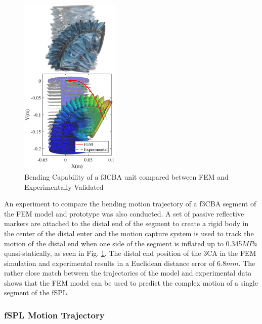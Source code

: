 \documentclass[letterpaper, 10 pt, conference]{ieeeconf}  %
\begin{document}
\begin{figure}[t!]
\centering
\includegraphics[width=0.43\textwidth]{Figures/3CA_bend_FEM_REAL_v2}
\caption{Bending Capability of a f3CBA unit compared between FEM and Experimentally Validated}
\label{fig:f3CAs_bend_fem_real}
\vspace{-1.5em}
\end{figure}


An experiment to compare the bending motion trajectory of a f3CBA segment of the FEM model and prototype was also conducted. A set of passive reflective markers are attached to the distal end of the segment to create a rigid body in the center of the distal enter and the motion capture system is used to track the motion of the distal end when one side of the segment is inflated up to 0.345$MPa$ quasi-statically, as seen in Fig. \ref{fig:f3CAs_bend_fem_real}. The distal end position of the 3CA in the FEM simulation and experimental results in a Euclidean distance error of 6.8$mm$. The rather close match between the trajectories of the model and experimental data shows that the FEM model can be used to predict the complex motion of a single segment of the fSPL.


\subsubsection{fSPL Motion Trajectory}
\end{document}
